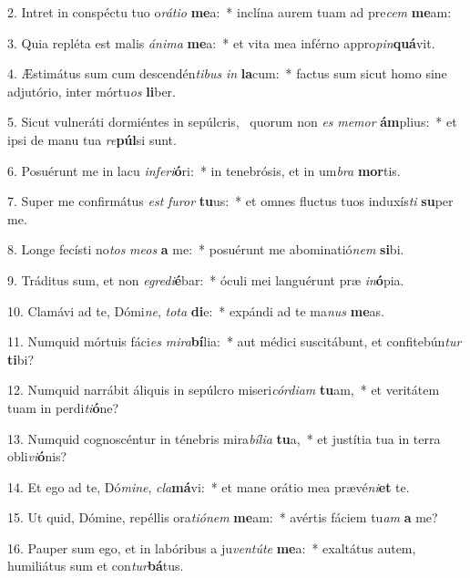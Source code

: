 2. Intret in conspéctu tuo o\textit{rá}\textit{ti}\textit{o} \textbf{me}a:~*  inclína aurem tuam ad pre\textit{cem} \textbf{me}am:\

3. Quia repléta est malis \textit{á}\textit{ni}\textit{ma} \textbf{me}a:~*  et vita mea inférno appro\textit{pin}\textbf{quá}vit.\

4. Æstimátus sum cum descendén\textit{ti}\textit{bus} \textit{in} \textbf{la}cum:~*  factus sum sicut homo sine adjutório, inter mórtu\textit{os} \textbf{li}ber.\

5. Sicut vulneráti dormiéntes in sepúlcris, \dag\  quorum non \textit{es} \textit{me}\textit{mor} \textbf{ám}plius:~*  et ipsi de manu tua \textit{re}\textbf{púl}si sunt.\

6. Posuérunt me in lacu \textit{in}\textit{fe}\textit{ri}\textbf{ó}ri:~*  in tenebrósis, et in um\textit{bra} \textbf{mor}tis.\

7. Super me confirmátus \textit{est} \textit{fu}\textit{ror} \textbf{tu}us:~*  et omnes fluctus tuos induxís\textit{ti} \textbf{su}per me.\

8. Longe fecísti no\textit{tos} \textit{me}\textit{os} \textbf{a} me:~*  posuérunt me abominatió\textit{nem} \textbf{si}bi.\

9. Tráditus sum, et non \textit{e}\textit{gre}\textit{di}\textbf{é}bar:~*  óculi mei languérunt præ \textit{in}\textbf{ó}pia.\

10. Clamávi ad te, Dómi\textit{ne}, \textit{to}\textit{ta} \textbf{di}e:~*  expándi ad te ma\textit{nus} \textbf{me}as.\

11. Numquid mórtuis fáci\textit{es} \textit{mi}\textit{ra}\textbf{bí}lia:~*  aut médici suscitábunt, et confitebún\textit{tur} \textbf{ti}bi?\

12. Numquid narrábit áliquis in sepúlcro miseri\textit{cór}\textit{di}\textit{am} \textbf{tu}am,~*  et veritátem tuam in perdi\textit{ti}\textbf{ó}ne?\

13. Numquid cognoscéntur in ténebris mira\textit{bí}\textit{li}\textit{a} \textbf{tu}a,~*  et justítia tua in terra obli\textit{vi}\textbf{ó}nis?\

14. Et ego ad te, Dó\textit{mi}\textit{ne}, \textit{cla}\textbf{má}vi:~*  et mane orátio mea prævé\textit{ni}\textbf{et} te.\

15. Ut quid, Dómine, repéllis ora\textit{ti}\textit{ó}\textit{nem} \textbf{me}am:~*  avértis fáciem tu\textit{am} \textbf{a} me?\

16. Pauper sum ego, et in labóribus a ju\textit{ven}\textit{tú}\textit{te} \textbf{me}a:~*  exaltátus autem, humiliátus sum et con\textit{tur}\textbf{bá}tus.\

